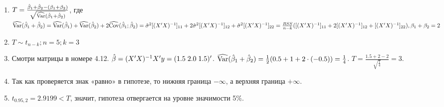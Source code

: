 \begin{problem}
\begin{sol}
\begin{enumerate}
\item $T = \frac{\hat{\beta}_1 + \hat{\beta}_2 - (\beta_1 + \beta_2)}{\sqrt{\widehat{\operatorname{Var}}(\hat{\beta}_1 + \hat{\beta}_2)}}$, где $\widehat{\operatorname{Var}}(\hat{\beta}_1 + \hat{\beta}_2) = \widehat{\operatorname{Var}}(\hat{\beta}_1) + \widehat{\operatorname{Var}}(\hat{\beta}_2) + 2\widehat{\operatorname{Cov}}(\hat{\beta}_1;\hat{\beta}_2) = \hat{\sigma}^2 [(X'X)^{-1}]_{11} + 2\hat{\sigma}^2 [(X'X)^{-1}]_{12} + \hat{\sigma}^2 [(X'X)^{-1}]_{22}= \frac{RSS}{n - k}([(X'X)^{-1}]_{11} + 2[(X'X)^{-1}]_{12} + [(X'X)^{-1}]_{22}), \beta_1 + \beta_2=2$
\item $T \sim t_{n-k}; n = 5; k = 3$
\item Смотри матрицы в номере 4.12. $\hat{\beta}=(X'X)^{-1}X'y=(1.5\;2.0\;1.5)'$. $\widehat{\operatorname{Var}}(\hat{\beta}_1 + \hat{\beta}_2) =\frac12(0.5+1+2\cdot(-0.5))=\frac14$. $T=\frac{1.5+2-2}{\sqrt{\frac14}}=3$.
\item Так как проверяется знак «равно» в гипотезе, то нижняя граница $-\infty$, а верхняя граница $+\infty$.
\item $t_{0.95,2}=2.9199<T$, значит, гипотеза отвергается на уровне значимости 5\%.
\end{enumerate}
\end{sol}
\end{problem}



